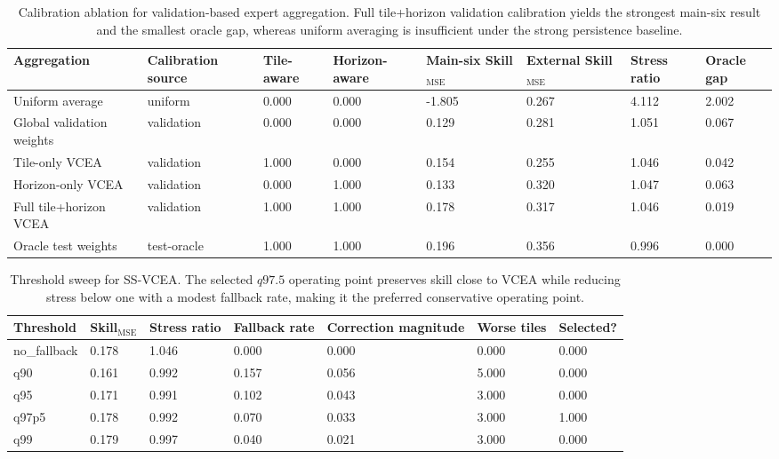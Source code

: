 \begin{table}[t]
\centering
\footnotesize
\begin{tabular}{llllllll}
\toprule
Aggregation & Calibration source & Tile-aware & Horizon-aware & Main-six Skill$_{\mathrm{MSE}}$ & External Skill$_{\mathrm{MSE}}$ & Stress ratio & Oracle gap \\
\midrule
Uniform average & uniform & 0.000 & 0.000 & -1.805 & 0.267 & 4.112 & 2.002 \\
Global validation weights & validation & 0.000 & 0.000 & 0.129 & 0.281 & 1.051 & 0.067 \\
Tile-only VCEA & validation & 1.000 & 0.000 & 0.154 & 0.255 & 1.046 & 0.042 \\
Horizon-only VCEA & validation & 0.000 & 1.000 & 0.133 & 0.320 & 1.047 & 0.063 \\
Full tile+horizon VCEA & validation & 1.000 & 1.000 & 0.178 & 0.317 & 1.046 & 0.019 \\
Oracle test weights & test-oracle & 1.000 & 1.000 & 0.196 & 0.356 & 0.996 & 0.000 \\
\bottomrule
\end{tabular}
\caption{Calibration ablation for validation-based expert aggregation. Full tile+horizon validation calibration yields the strongest main-six result and the smallest oracle gap, whereas uniform averaging is insufficient under the strong persistence baseline.}
\label{tab:e3_calibration_ablation}
\end{table}

\begin{table}[t]
\centering
\footnotesize
\begin{tabular}{lllllll}
\toprule
Threshold & Skill$_{\mathrm{MSE}}$ & Stress ratio & Fallback rate & Correction magnitude & Worse tiles & Selected? \\
\midrule
no\_fallback & 0.178 & 1.046 & 0.000 & 0.000 & 0.000 & 0.000 \\
q90 & 0.161 & 0.992 & 0.157 & 0.056 & 5.000 & 0.000 \\
q95 & 0.171 & 0.991 & 0.102 & 0.043 & 3.000 & 0.000 \\
q97p5 & 0.178 & 0.992 & 0.070 & 0.033 & 3.000 & 1.000 \\
q99 & 0.179 & 0.997 & 0.040 & 0.021 & 3.000 & 0.000 \\
\bottomrule
\end{tabular}
\caption{Threshold sweep for SS-VCEA. The selected $q97.5$ operating point preserves skill close to VCEA while reducing stress below one with a modest fallback rate, making it the preferred conservative operating point.}
\label{tab:e6_threshold_sweep}
\end{table}


